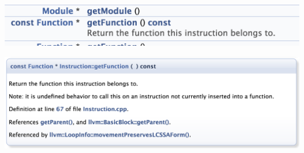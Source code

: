 \documentclass[a4paper,12pt,twoside]{book}
\begin{document}
\begin{itemize}
\includegraphics[scale=0.45]{pics/dox1.png} \newline

\includegraphics[scale=0.45]{pics/dox2.png} 

\end{itemize}
\end{document}

